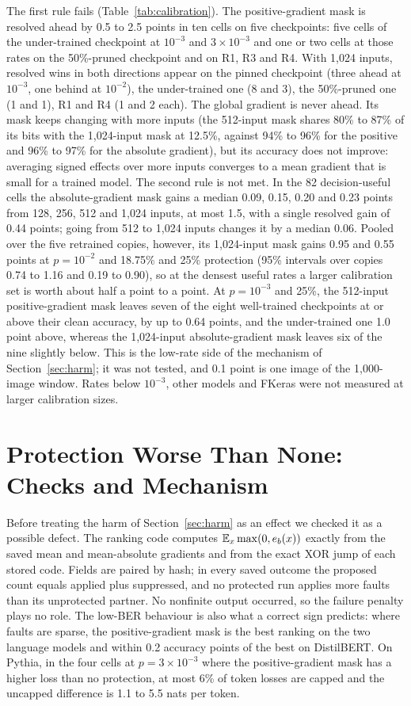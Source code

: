 The first rule fails (Table~\ref{tab:calibration}). The positive-gradient mask is resolved ahead by 0.5 to 2.5 points in ten cells on five checkpoints: five cells of the under-trained checkpoint at $10^{-3}$ and $3\times10^{-3}$ and one or two cells at those rates on the 50\%-pruned checkpoint and on R1, R3 and R4. With 1,024 inputs, resolved wins in both directions appear on the pinned checkpoint (three ahead at $10^{-3}$, one behind at $10^{-2}$), the under-trained one (8 and 3), the 50\%-pruned one (1 and 1), R1 and R4 (1 and 2 each). The global gradient is never ahead. Its mask keeps changing with more inputs (the 512-input mask shares 80\% to 87\% of its bits with the 1,024-input mask at 12.5\%, against 94\% to 96\% for the positive and 96\% to 97\% for the absolute gradient), but its accuracy does not improve: averaging signed effects over more inputs converges to a mean gradient that is small for a trained model. The second rule is not met. In the 82 decision-useful cells the absolute-gradient mask gains a median 0.09, 0.15, 0.20 and 0.23 points from 128, 256, 512 and 1,024 inputs, at most 1.5, with a single resolved gain of 0.44 points; going from 512 to 1,024 inputs changes it by a median 0.06. Pooled over the five retrained copies, however, its 1,024-input mask gains 0.95 and 0.55 points at $p=10^{-2}$ and 18.75\% and 25\% protection (95\% intervals over copies 0.74 to 1.16 and 0.19 to 0.90), so at the densest useful rates a larger calibration set is worth about half a point to a point. At $p=10^{-3}$ and 25\%, the 512-input positive-gradient mask leaves seven of the eight well-trained checkpoints at or above their clean accuracy, by up to 0.64 points, and the under-trained one 1.0 point above, whereas the 1,024-input absolute-gradient mask leaves six of the nine slightly below. This is the low-rate side of the mechanism of Section~\ref{sec:harm}; it was not tested, and 0.1 point is one image of the 1,000-image window. Rates below $10^{-3}$, other models and FKeras were not measured at larger calibration sizes.

\section{Protection Worse Than None: Checks and Mechanism}\label{app:harm}
Before treating the harm of Section~\ref{sec:harm} as an effect we checked it as a possible defect. The ranking code computes $\mathbb{E}_x\max(0,e_b(x))$ exactly from the saved mean and mean-absolute gradients and from the exact XOR jump of each stored code. Fields are paired by hash; in every saved outcome the proposed count equals applied plus suppressed, and no protected run applies more faults than its unprotected partner. No nonfinite output occurred, so the failure penalty plays no role. The low-BER behaviour is also what a correct sign predicts: where faults are sparse, the positive-gradient mask is the best ranking on the two language models and within 0.2 accuracy points of the best on DistilBERT. On Pythia, in the four cells at $p=3\times10^{-3}$ where the positive-gradient mask has a higher loss than no protection, at most 6\% of token losses are capped and the uncapped difference is 1.1 to 5.5 nats per token.

